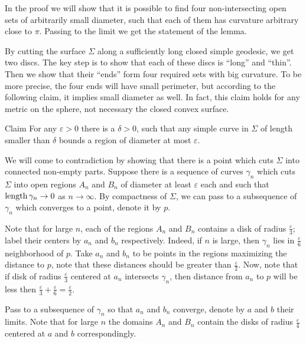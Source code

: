 \documentclass[oneside,a4paper, 12pt]{article}
\begin{document}
In the proof we will show that 
it is possible to find four non-intersecting open sets of arbitrarily small diameter, 
such that each of them has curvature arbitrary close to $\pi$.
Passing to the limit we get the statement of the lemma.

By cutting the surface $\Sigma$ along a sufficiently long closed simple geodesic,
we get two discs.
The key step is to show that each of these discs is ``long'' and ``thin''.
Then we show that their ``ends'' form four required sets with big curvature.
To be more precise, the four ends will have small perimeter,
but according to the following claim, it implies small diameter as well.
In fact, this claim holds for any metric on the sphere, not necessary the closed convex surface.

\begin{thm}{Claim}\label{Lemma:diameter-perimeter}
For any $\varepsilon>0$ there is a $\delta>0$, such that any simple curve in $\Sigma$ of length smaller than $\delta$ bounds a region of diameter at most $\varepsilon$.
\end{thm}

We will come to contradiction by showing that there is a point which cuts $\Sigma$ into connected non-empty parts.
Suppose there is a sequence of curves $\gamma_n$ which cuts $\Sigma$ into open regions $A_n$ and $B_n$ of diameter at least $\varepsilon$ each and such that $\mathop{\rm length}\nolimits\gamma_n\to 0$ as $n\to\infty$. 
By compactness of $\Sigma$,
we can pass to a subsequence of $\gamma_n$ which converges to a point, denote it by $p$.

Note that for large $n$, each of the regions $A_n$ and $B_n$ contains a disk of radius $\tfrac{\varepsilon}{3}$;
label their centers by $a_n$ and $b_n$ respectively. 
Indeed, if $n$ is large, then $\gamma_n$ lies in $\tfrac{\varepsilon}{6}$ neighborhood of $p$.
Take $a_n$ and $b_n$ to be points in the regions maximizing the distance to $p$, note that these distances should be greater than $\tfrac{\varepsilon}{2}$.
Now, note that if disk of radius $\tfrac{\varepsilon}{3}$ centered at $a_n$ intersects $\gamma_n$, then distance from $a_n$ to $p$ will be less then $\tfrac{\varepsilon}{3}+\tfrac{\varepsilon}{6}=\tfrac{\varepsilon}{2}$.

Pass to a subsequence of $\gamma_n$ so that $a_n$ and $b_n$ converge, denote by $a$ and $b$ their limits.
Note that for large $n$ the domains $A_n$ and $B_n$ contain the disks of radius $\tfrac\varepsilon4$ centered at $a$ and $b$ correspondingly.
\end{document}
